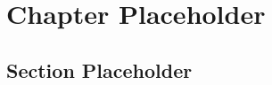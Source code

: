 \documentclass[11pt]{book}
\begin{document}
\frontmatter
\tableofcontents

\mainmatter


% 

\chapter{Chapter Placeholder}
\label{ch:placeholder}

\section{Section Placeholder}
\label{sec:placeholder}
\end{document}
